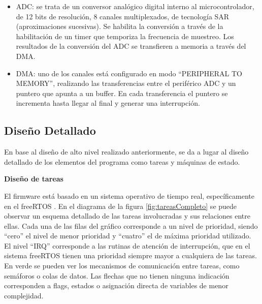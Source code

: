 \begin{itemize}
	\item ADC: se trata de un conversor analógico digital interno al microcontrolador, de 12 bits de resolución, 8 canales multiplexados, de tecnología SAR (aproximaciones sucesivas). Se habilita la conversión a través de la habilitación de un timer que temporiza la frecuencia de muestreo. Los resultados de la conversión del ADC se transfieren a memoria a través del DMA.
	\item DMA: uno de los canales está configurado en modo “PERIPHERAL TO MEMORY”, realizando las transferencias entre el periférico ADC y un puntero que apunta a un buffer. En cada transferencia el puntero se incrementa hasta llegar al final y generar una interrupción. 
\end{itemize}

\subsection{Diseño Detallado}

En base al diseño de alto nivel realizado anteriormente, se da a lugar al diseño detallado de los elementos del programa como tareas y máquinas de estado.

\textbf{Diseño de tareas}

El firmware está basado en un sistema operativo de tiempo real, específicamente en el freeRTOS \citep{aws2017}.  En el diagrama de la figura \ref{fig:tareasCompleto} se puede observar un esquema detallado de las tareas involucradas y sus relaciones entre ellas. Cada una de las filas del gráfico corresponde a un nivel de prioridad, siendo “cero” el nivel de menor prioridad y “cuatro” el de máxima prioridad utilizado. El nivel “IRQ” corresponde a las rutinas de atención de interrupción, que en el sistema freeRTOS tienen una prioridad siempre mayor a cualquiera de las tareas. En verde se pueden ver los mecanismos de comunicación entre tareas, como semáforos o colas de datos. Las flechas que no tienen ninguna indicación corresponden a flags, estados o asignación directa de variables de menor complejidad. 

